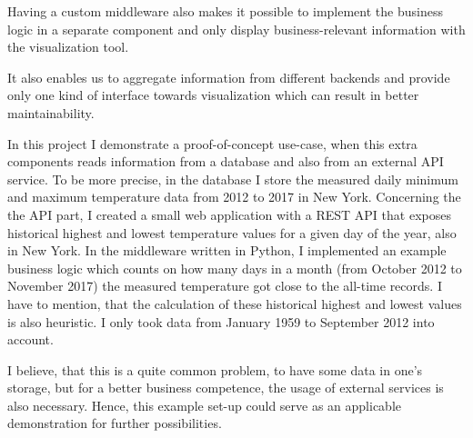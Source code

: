 Having a custom middleware also makes it possible to implement the business logic in a separate component and only display business-relevant information with the visualization tool.

It also enables us to aggregate information from different backends and provide only one kind of interface towards visualization which can result in better maintainability.

In this project I demonstrate a proof-of-concept use-case, when this extra components reads information from a database and also from an external API service. To be more precise, in the database I store the measured daily minimum and maximum temperature data from 2012 to 2017 in New York. Concerning the the API part, I created a small web application with a REST API that exposes historical highest and lowest temperature values for a given day of the year, also in New York. In the middleware written in Python, I implemented an example business logic which counts on how many days in a month (from October 2012 to November 2017) the measured temperature got close to the all-time records. I have to mention, that the calculation of these historical highest and lowest values is also heuristic. I only took data from January 1959 to September 2012 into account.

I believe, that this is a quite common problem, to have some data in one's storage, but for a better business competence, the usage of external services is also necessary. Hence, this example set-up could serve as an applicable demonstration for further possibilities.